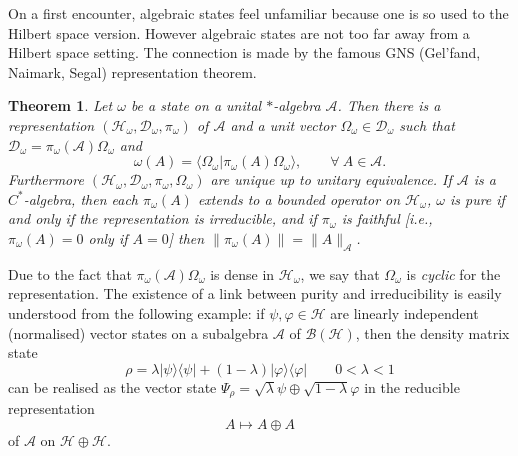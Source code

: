\documentclass[12pt]{article}
\newcommand{\1}{\mathds{1}}                         %
\newcommand{\BB}{{\mathcal{B}}}
\newcommand{\HH}{{\mathcal{H}}}
\newcommand{\DD}{{\mathscr{D}}}
\newcommand{\Ac}{{\mathcal{A}}}
\newcommand{\ip}[2]{\langle #1|#2\rangle}
\newcommand{\ket}[1]{|#1\rangle}
\newcommand{\bra}[1]{\langle #1|}
\newtheorem{theorem}{Theorem}%
\begin{document}
On a first encounter, algebraic states feel unfamiliar because one is so used to the Hilbert space version. However algebraic states are not too far away from a Hilbert space setting. The connection is made by the famous GNS (Gel'fand, Naimark, Segal) representation theorem. 
\begin{theorem} Let $\omega$ be a state on a unital $*$-algebra $\Ac$. 
	Then there is a representation $(\HH_\omega,\DD_\omega,\pi_\omega)$
	of $\Ac$ and a unit
	vector $\Omega_\omega\in\DD_\omega$ such that $\DD_\omega=\pi_\omega(\Ac)\Omega_\omega$ and
	\begin{equation}\label{eq:GNSprop}
	\omega(A) =\ip{\Omega_\omega}{\pi_\omega(A)\Omega_\omega}, \qquad \forall~A\in \Ac.
	\end{equation}
	Furthermore $(\HH_\omega,\DD_\omega,\pi_\omega,\Omega_\omega)$ are unique up to unitary equivalence. If $\Ac$ is a $C^*$-algebra,
	then each $\pi_\omega(A)$ extends to a bounded operator on $\HH_\omega$, 
	$\omega$ is pure if and only if the representation is irreducible, 
	and if $\pi_\omega$ is faithful [i.e., $\pi_\omega(A)=0$ only if $A=0$] then $\|\pi_\omega(A)\|=\|A\|_{\Ac}$.
\end{theorem}
Due to the fact that $\pi_\omega(\Ac)\Omega_\omega$ is dense in $\HH_\omega$, we say that $\Omega_\omega$ is \emph{cyclic} for the representation.
The existence of a link between purity and irreducibility is easily understood from the following example: if $\psi,\varphi\in\HH$ are linearly independent (normalised) vector states on a subalgebra $\Ac$ of $\BB(\HH)$, then the density matrix state
\[
\rho = \lambda \ket{\psi}\bra{\psi} + (1-\lambda)\ket{\varphi}\bra{\varphi}\qquad
0<\lambda<1
\]
can be realised as the vector state $\Psi_\rho=\sqrt{\lambda}\psi\oplus \sqrt{1-\lambda}\varphi$ in the reducible representation
\[
A\mapsto A\oplus A
\]
of $\Ac$ on $\HH\oplus\HH$.

\end{document}
